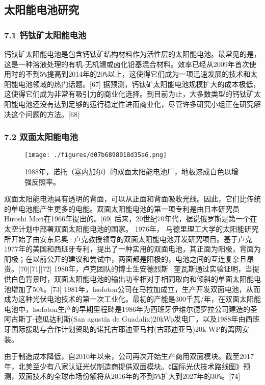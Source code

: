 \subsection{太阳能电池研究}

\subsubsection{7.1 钙钛矿太阳能电池}

钙钛矿太阳能电池是包含钙钛矿结构材料作为活性层的太阳能电池。最常见的是，这是一种溶液处理的有机-无机锡或卤化铅基混合材料。效率已经从2009年首次使用时的不到5\verb`%`提高到2014年的20\verb`%`以上，这使得它们成为一项迅速发展的技术和太阳能电池领域的热门话题。[67] 据预测，钙钛矿太阳能电池规模扩大的成本极低，这使得它们成为非常有吸引力的商业化选择。到目前为止，大多数类型的钙钛矿太阳能电池还没有达到足够的运行稳定性进而商业化，尽管许多研究小组正在研究解决这个问题的方法。[68]

\subsubsection{7.2 双面太阳能电池}

\begin{figure}[ht]
\centering
\texttt{[image: ./figures/d07b6898018d35a6.png]}
\caption{1988年，诺托（塞内加尔）的双面太阳能电池厂，地板漆成白色以增强反照率。} \label{fig_TYNDC_5}
\end{figure}

双面太阳能电池具有透明的背面，可以从正面和背面吸收光线。因此，它们比传统的单电池能产生更多的电能。双面太阳能电池的第一项专利是由日本研究员Hiroshi Mori在1966年提出的。[69] 后来，20世纪70年代，据说俄罗斯是第一个在太空计划中部署双面太阳能电池的国家。 1976年， 马德里理工大学的太阳能研究所开始了由安东尼奥·卢克教授领导的双面太阳能电池开发研究项目。基于卢克1977年的美国和西班牙专利，提出了一种实用的双面电池，其正面为阳极，背面为阴极；在以前公开的建议和尝试中，两面都是阳极的，电池之间的互连复杂且昂贵。[70][71][72] 1980年，卢克团队的博士生安德烈斯·奎瓦斯通过实验证明，当提供白色背景时，双面太阳能电池的输出功率相对于相同取向和倾斜的单面太阳能电池增加了50\verb`%`。[73] 1981年，Isofoton公司在马拉加成立，生产开发双面电池，从而成为这种光伏电池技术的第一次工业化。最初的产能是300千瓦/年，在双面太阳能电池中，Isofoton生产的早期里程碑是1986年为西班牙伊维尔德罗拉公司建造的圣阿古斯丁-德瓜达利斯(San agustín de Guadalix)20kWp发电厂，以及1988年由西班牙国际援助与合作计划资助的诺托古耶迪亚马村(古耶迪亚马)20k WP的离网安装。

由于制造成本降低，自2010年以来，公司再次开始生产商用双面模块。截至2017年，北美至少有八家认证光伏制造商提供双面模块。《国际光伏技术路线图》预测，双面技术的全球市场份额将从2016年的不到5\verb`%`扩大到2027年的30\verb`%`。[74]


